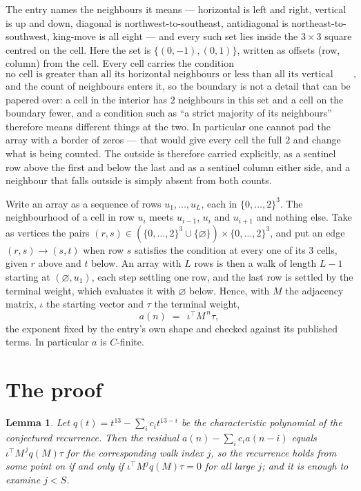 \documentclass[11pt,a4paper]{article}
\theoremstyle{plain}
\newtheorem{lemma}[theorem]{Lemma}
\theoremstyle{definition}
\begin{document}
The entry names the neighbours it means --- horizontal is left and right, vertical is up and
down, diagonal is northwest-to-southeast, antidiagonal is northeast-to-southwest, king-move is
all eight --- and every such set lies inside the $3\times3$ square centred on the cell. Here
the set is $\{(0,-1), (0,1)\}$, written as offsets (row, column) from the cell. Every cell carries
the condition
\[
\text{no cell is greater than all its horizontal neighbours or less than all its vertical neighbours},
\]
and the count of neighbours enters it, so the boundary is not a detail that can be papered
over: a cell in the interior has $2$ neighbours in this set and a cell on the boundary
fewer, and a condition such as ``a strict majority of its neighbours'' therefore means
different things at the two. In particular one cannot pad the array with a border of zeros ---
that would give every cell the full $2$ and change what is being counted. The outside is
therefore carried
explicitly, as a sentinel row above the first and below the last and as a sentinel column
either side, and a neighbour that falls outside is simply absent from both counts.

Write an array as a sequence of rows $u_1,\dots,u_L$, each in
$\{0,\dots,2\}^{3}$. The neighbourhood of a cell in row $u_i$ meets $u_{i-1}$,
$u_i$ and $u_{i+1}$ and nothing else. Take as vertices the pairs
$(r,s)\in(\{0,\dots,2\}^{3}\cup\{\varnothing\})\times\{0,\dots,2\}^{3}$,
and put an edge $(r,s)\to(s,t)$ when row $s$ satisfies the condition at every one of its
$3$ cells, given $r$ above and $t$ below. An array with $L$ rows is then a walk of length
$L-1$ starting at $(\varnothing,u_1)$, each step settling one row, and the last row is
settled by the terminal weight, which evaluates it with $\varnothing$ below. Hence,
with $M$ the adjacency matrix, $\iota$ the starting vector and $\tau$ the terminal weight,
\[
a(n)\;=\;\,\iota^{\!\top}M^{\,n}\tau ,
\]
the exponent fixed by the entry's own shape and checked against its published terms. In
particular $a$ is $C$-finite.

\section{The proof}

\begin{lemma}\label{lem:crit}
Let $q(t)=t^{13}-\sum_i c_it^{13-i}$ be the characteristic polynomial of the
conjectured recurrence. Then the residual $a(n)-\sum_ic_ia(n-i)$ equals
$\iota^{\!\top}M^{\,j}q(M)\tau$ for the corresponding walk index $j$, so the
recurrence holds from some point on if and only if $\iota^{\!\top}M^{j}q(M)\tau=0$ for all
large $j$; and it is enough to examine $j<S$.
\end{lemma}
\end{document}
